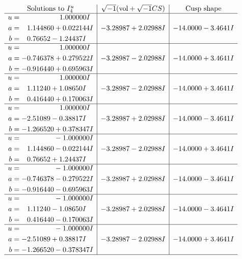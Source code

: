 \documentclass[1p]{elsarticle_modified}
\theoremstyle{definition}
\newcommand{\I}{\sqrt{-1}}
\begin{document}
$$\begin{array}{c|c|c}  
\text{Solutions to }I^u_{4}& \I (\text{vol} + \sqrt{-1}CS) & \text{Cusp shape}\\
 \hline 
\begin{aligned}
u &= \phantom{-0.000000 -}1.000000 I \\
a &= \phantom{-}1.144860 + 0.022144 I \\
b &= \phantom{-}0.76652 - 1.24437 I\end{aligned}
 & -3.28987 + 2.02988 I & -14.0000 - 3.4641 I \\ \hline\begin{aligned}
u &= \phantom{-0.000000 -}1.000000 I \\
a &= -0.746378 + 0.279522 I \\
b &= -0.916440 + 0.695963 I\end{aligned}
 & -3.28987 - 2.02988 I & -14.0000 + 3.4641 I \\ \hline\begin{aligned}
u &= \phantom{-0.000000 -}1.000000 I \\
a &= \phantom{-}1.11240 + 1.08650 I \\
b &= \phantom{-}0.416440 + 0.170063 I\end{aligned}
 & -3.28987 - 2.02988 I & -14.0000 + 3.4641 I \\ \hline\begin{aligned}
u &= \phantom{-0.000000 -}1.000000 I \\
a &= -2.51089 - 0.38817 I \\
b &= -1.266520 + 0.378347 I\end{aligned}
 & -3.28987 + 2.02988 I & -14.0000 - 3.4641 I \\ \hline\begin{aligned}
u &= \phantom{-0.000000 } -1.000000 I \\
a &= \phantom{-}1.144860 - 0.022144 I \\
b &= \phantom{-}0.76652 + 1.24437 I\end{aligned}
 & -3.28987 - 2.02988 I & -14.0000 + 3.4641 I \\ \hline\begin{aligned}
u &= \phantom{-0.000000 } -1.000000 I \\
a &= -0.746378 - 0.279522 I \\
b &= -0.916440 - 0.695963 I\end{aligned}
 & -3.28987 + 2.02988 I & -14.0000 - 3.4641 I \\ \hline\begin{aligned}
u &= \phantom{-0.000000 } -1.000000 I \\
a &= \phantom{-}1.11240 - 1.08650 I \\
b &= \phantom{-}0.416440 - 0.170063 I\end{aligned}
 & -3.28987 + 2.02988 I & -14.0000 - 3.4641 I \\ \hline\begin{aligned}
u &= \phantom{-0.000000 } -1.000000 I \\
a &= -2.51089 + 0.38817 I \\
b &= -1.266520 - 0.378347 I\end{aligned}
 & -3.28987 - 2.02988 I & -14.0000 + 3.4641 I\\
 \hline 
 \end{array}$$\newpage
\end{document}
